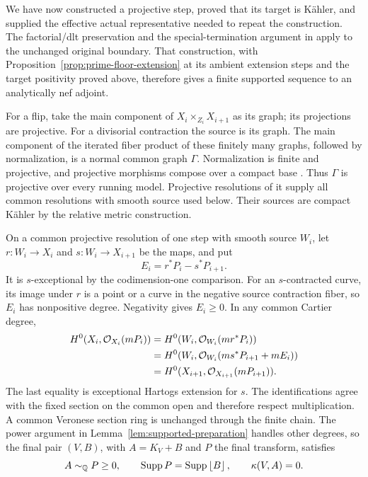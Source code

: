 We have now constructed a projective step, proved that its target is
K\"ahler, and supplied the effective actual representative needed to
repeat the construction.  The factorial/dlt preservation and the
special-termination argument in
\cite[proof of Theorem~7.2]{DasHaconPaun2024} apply to the unchanged
original boundary.  That construction, with
Proposition~\ref{prop:prime-floor-extension} at its ambient extension
steps and the target positivity proved above, therefore gives a finite
supported sequence to an analytically nef adjoint.

For a flip, take the main component of
\(X_i\times_{Z_i}X_{i+1}\) as its graph; its projections are projective.
For a divisorial contraction the source is its graph.  The main component
of the iterated fiber product of these finitely many graphs, followed by
normalization, is a normal common graph \(\Gamma\).  Normalization is
finite and projective, and projective morphisms compose over a compact
base \cite[Remark~2.11]{DasHaconPaun2024}.  Thus \(\Gamma\) is projective
over every running model.  Projective resolutions of it supply all common
resolutions with smooth source used below.  Their sources are compact K\"ahler by
the relative metric construction.

On a common projective resolution of one step with smooth source \(W_i\),
let \(r:W_i\to X_i\) and \(s:W_i\to X_{i+1}\) be the maps, and put
\begin{equation}\label{eq:step-difference}
 E_i=r^*P_i-s^*P_{i+1}.
\end{equation}
It is \(s\)-exceptional by the codimension-one comparison.  For an
\(s\)-contracted curve, its image under \(r\) is a point or a curve in
the negative source contraction fiber, so \(E_i\) has nonpositive degree.
Negativity gives \(E_i\geq0\).  In any common Cartier degree,
\begin{align*}
 H^0(X_i,\mathcal O_{X_i}(mP_i))
 &=H^0(W_i,\mathcal O_{W_i}(mr^*P_i))\\
 &=H^0(W_i,\mathcal O_{W_i}(ms^*P_{i+1}+mE_i))\\
 &=H^0(X_{i+1},\mathcal O_{X_{i+1}}(mP_{i+1})).
\end{align*}
The last equality is exceptional Hartogs extension for \(s\).
The identifications agree with the fixed section on the common open and
therefore respect multiplication.  A common Veronese section ring is
unchanged through the finite chain.  The power argument in
Lemma~\ref{lem:supported-preparation} handles other degrees, so the final
pair \((V,B)\), with \(A=K_V+B\) and \(P\) the final transform, satisfies
\begin{equation}\label{eq:final-supported}
 A\sim_\mathbb Q P\geq0,\qquad
 \operatorname{Supp} P=\operatorname{Supp}\left\lfloor B\right\rfloor,\qquad \kappa(V,A)=0.
\end{equation}

